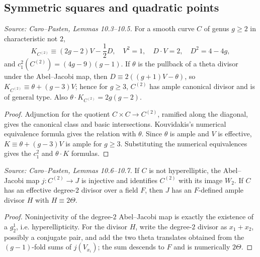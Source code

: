 \subsection{Symmetric squares and quadratic points}

\begin{lemma}
  \label{lem:cp_symmetric_square_intersections}
  \textit{Source: Caro--Pasten, Lemmas 10.3--10.5.}
  For a smooth curve \(C\) of genus \(g\ge2\) in characteristic not \(2\),
  \[
    K_{C^{(2)}}\equiv(2g-2)V-\frac12D,\quad
    V^2=1,\quad D\cdot V=2,\quad D^2=4-4g,
  \]
  and \(c_1^2(C^{(2)})=(4g-9)(g-1)\).  If \(\theta\) is the pullback of a
  theta divisor under the Abel--Jacobi map, then
  \(D\equiv2((g+1)V-\theta)\), so
  \(K_{C^{(2)}}\equiv\theta+(g-3)V\); hence for \(g\ge3\),
  \(C^{(2)}\) has ample canonical divisor and is of general type.  Also
  \(\theta\cdot K_{C^{(2)}}=2g(g-2)\).
\end{lemma}
\begin{proof}
  Adjunction for the quotient \(C\times C\to C^{(2)}\), ramified along the
  diagonal, gives the canonical class and basic intersections.  Kouvidakis's
  numerical equivalence formula gives the relation with \(\theta\).  Since
  \(\theta\) is ample and \(V\) is effective, \(K\equiv\theta+(g-3)V\) is ample
  for \(g\ge3\).  Substituting the numerical equivalences gives the
  \(c_1^2\) and \(\theta\cdot K\) formulas.
\end{proof}

\begin{lemma}
  \label{lem:cp_symmetric_square_jacobian_embedding}
  \textit{Source: Caro--Pasten, Lemmas 10.6--10.7.}
  If \(C\) is not hyperelliptic, the Abel--Jacobi map
  \(j:C^{(2)}\to J\) is injective and identifies \(C^{(2)}\) with its image
  \(W_2\).  If \(C\) has an effective degree-\(2\) divisor over a field \(F\),
  then \(J\) has an \(F\)-defined ample divisor \(H\) with
  \(H\equiv2\Theta\).
\end{lemma}
\begin{proof}
  Noninjectivity of the degree-\(2\) Abel--Jacobi map is exactly the existence
  of a \(g^1_2\), i.e. hyperellipticity.  For the divisor \(H\), write the
  degree-\(2\) divisor as \(x_1+x_2\), possibly a conjugate pair, and add the
  two theta translates obtained from the \((g-1)\)-fold sums of
  \(j(V_{x_i})\); the sum descends to \(F\) and is numerically \(2\Theta\).
\end{proof}

